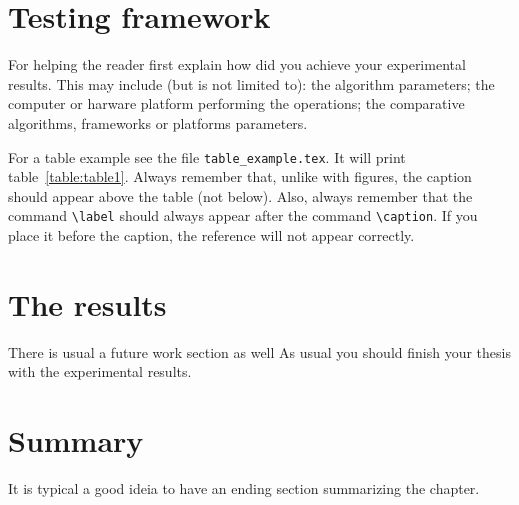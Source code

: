 \section{Testing framework}
For helping the reader first explain how did you achieve your experimental results. This may include (but is not limited to): the algorithm parameters; the computer or harware platform performing the operations; the comparative algorithms, frameworks or platforms parameters.



For a table example see the file \verb"table_example.tex". It will print table~\ref{table:table1}. Always remember that, unlike with figures, the caption should appear above the table (not below). Also, always remember that the command \verb"\label" should always appear after the command \verb"\caption". If you place it before the caption, the reference will not appear correctly.

\section{The results}
There is usual a future work section as well
As usual you should finish your thesis with the experimental results.

\section{Summary}

It is typical a good ideia to have an ending section summarizing the chapter.

\cleardoublepage
 
